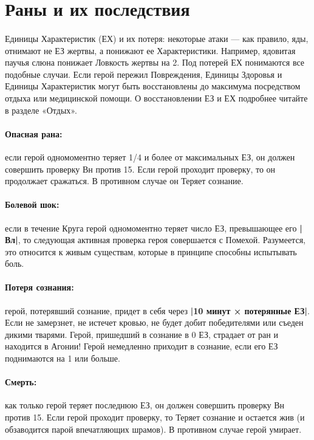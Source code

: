\section{Раны и их последствия}
\paragraph{}
Единицы Характеристик (ЕХ) и их потеря: некоторые атаки — как правило, яды, отнимают не ЕЗ жертвы, а понижают ее Характеристики. Например, ядовитая паучья слюна понижает Ловкость жертвы на 2. Под потерей ЕХ понимаются все подобные случаи.
\newline
Если герой пережил Повреждения, Единицы Здоровья и Единицы Характеристик могут быть восстановлены до максимума посредством отдыха или медицинской помощи. О восстановлении ЕЗ и ЕХ подробнее читайте в разделе «Отдых».
\paragraph{Опасная рана:} если герой одномоментно теряет 1/4 и более от максимальных ЕЗ, он должен совершить проверку Вн против 15. Если герой проходит проверку, то он продолжает сражаться. В противном случае он Теряет сознание.
\paragraph{Болевой шок:} если в течение Круга герой одномоментно теряет число ЕЗ, превышающее его \textbf{|Вл|}, то следующая активная проверка героя совершается с Помехой. Разумеется, это относится к живым существам, которые в принципе способны испытывать боль.
\paragraph{Потеря сознания:} герой, потерявший сознание, придет в себя через \textbf{|10 минут × потерянные ЕЗ|}. Если не замерзнет, не истечет кровью, не будет добит победителями или съеден дикими тварями. Герой, пришедший в сознание в 0 ЕЗ, страдает от ран и находится в Агонии!
\newline
Герой немедленно приходит в сознание, если его ЕЗ поднимаются на 1 или больше.
\paragraph{Смерть:} как только герой теряет последнюю ЕЗ, он должен совершить проверку Вн против 15. Если герой проходит проверку, то Теряет сознание и остается жив (и обзаводится парой впечатляющих шрамов). В противном случае герой умирает.
